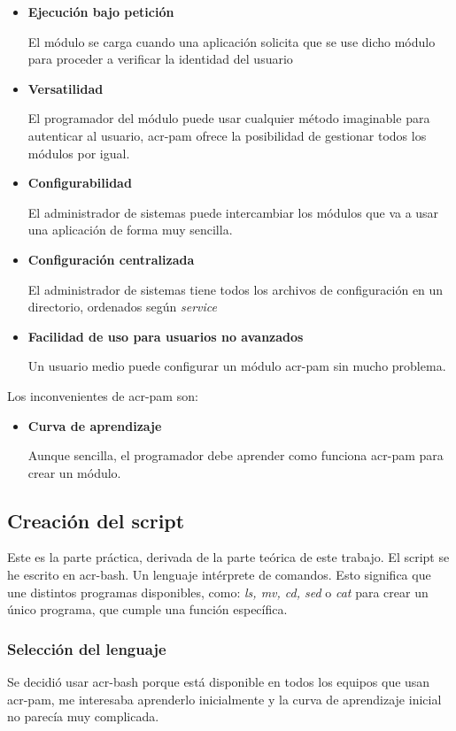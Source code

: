 \documentclass[twoside, titlepage, 12pt, a4paper]{article}
\begin{document}
{\begin{itemize}
		Al ser un módulo tan extendido, esto significa que prácticamente cualquier usuario de \gls{GNU/Linux} e incluso MacOS puede disfrutar de als ventajas del \gls{acr-dfa}
	\item{\textbf{Ejecución bajo petición}}\par
		El módulo se carga cuando una aplicación solicita que se use dicho módulo para proceder a verificar la identidad del usuario
	\item{\textbf{Versatilidad}}\par
		El programador del módulo puede usar cualquier método imaginable para autenticar al usuario, \gls{acr-pam} ofrece la posibilidad de gestionar todos los módulos por igual.
	\item{\textbf{Configurabilidad}}\par
		El administrador de sistemas puede intercambiar los módulos que va a usar una aplicación de forma muy sencilla.
	\item{\textbf{Configuración centralizada}}\par
		El administrador de sistemas tiene todos los archivos de configuración en un directorio, ordenados según \textit{service}
	\item{\textbf{Facilidad de uso para usuarios no avanzados}}\par
		Un usuario medio puede configurar un módulo \gls{acr-pam} sin mucho problema.
\end{itemize}
Los inconvenientes de \gls{acr-pam} son:
\begin{itemize}
	\item{\textbf{Curva de aprendizaje}}\par
		Aunque sencilla, el programador debe aprender como funciona \gls{acr-pam} para crear un módulo.
\end{itemize}
\subsection{Creación del \gls{script}}
Este es la parte práctica, derivada de la parte teórica de este trabajo. El \gls{script} se he escrito en \gls{acr-bash}. Un lenguaje intérprete de comandos. Esto significa que une distintos programas disponibles, como: \textit{ls, mv, cd, sed} o \textit{cat} para crear un único programa, que cumple una función específica.\par
\subsubsection{Selección del lenguaje}
Se decidió usar \gls{acr-bash} porque está disponible en todos los equipos que usan \gls{acr-pam}, me interesaba aprenderlo inicialmente y la curva de aprendizaje inicial no parecía muy complicada.\par
}
\end{document}
